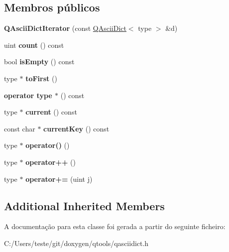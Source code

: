 \subsection*{Membros públicos}
\begin{DoxyCompactItemize}
\item 
\hypertarget{class_q_ascii_dict_iterator_abe4c7e3f541c4d934d003ac9fa6db236}{{\bfseries Q\-Ascii\-Dict\-Iterator} (const \hyperlink{class_q_ascii_dict}{Q\-Ascii\-Dict}$<$ type $>$ \&d)}\label{class_q_ascii_dict_iterator_abe4c7e3f541c4d934d003ac9fa6db236}

\item 
\hypertarget{class_q_ascii_dict_iterator_a774149fc271ebaba2aabcd183a836e8f}{uint {\bfseries count} () const }\label{class_q_ascii_dict_iterator_a774149fc271ebaba2aabcd183a836e8f}

\item 
\hypertarget{class_q_ascii_dict_iterator_a479432127ee77145cc19d6a2d1590821}{bool {\bfseries is\-Empty} () const }\label{class_q_ascii_dict_iterator_a479432127ee77145cc19d6a2d1590821}

\item 
\hypertarget{class_q_ascii_dict_iterator_a7e3cadfe5d178fc4db2e97112af20024}{type $\ast$ {\bfseries to\-First} ()}\label{class_q_ascii_dict_iterator_a7e3cadfe5d178fc4db2e97112af20024}

\item 
\hypertarget{class_q_ascii_dict_iterator_a2e144510e7eb044f9d96660f6590a589}{{\bfseries operator type $\ast$} () const }\label{class_q_ascii_dict_iterator_a2e144510e7eb044f9d96660f6590a589}

\item 
\hypertarget{class_q_ascii_dict_iterator_ac22b90cda8a81fe45ae121578fcf9726}{type $\ast$ {\bfseries current} () const }\label{class_q_ascii_dict_iterator_ac22b90cda8a81fe45ae121578fcf9726}

\item 
\hypertarget{class_q_ascii_dict_iterator_a61c51c740822498cafca355946ba7cbb}{const char $\ast$ {\bfseries current\-Key} () const }\label{class_q_ascii_dict_iterator_a61c51c740822498cafca355946ba7cbb}

\item 
\hypertarget{class_q_ascii_dict_iterator_a53bb20f7dd4f90cc047f999b7dec5fe0}{type $\ast$ {\bfseries operator()} ()}\label{class_q_ascii_dict_iterator_a53bb20f7dd4f90cc047f999b7dec5fe0}

\item 
\hypertarget{class_q_ascii_dict_iterator_a60e0a5b2a616525ebaec6c235b066c3e}{type $\ast$ {\bfseries operator++} ()}\label{class_q_ascii_dict_iterator_a60e0a5b2a616525ebaec6c235b066c3e}

\item 
\hypertarget{class_q_ascii_dict_iterator_a689beef631dff5b294c16f1246e6c230}{type $\ast$ {\bfseries operator+=} (uint j)}\label{class_q_ascii_dict_iterator_a689beef631dff5b294c16f1246e6c230}

\end{DoxyCompactItemize}
\subsection*{Additional Inherited Members}


A documentação para esta classe foi gerada a partir do seguinte ficheiro\-:\begin{DoxyCompactItemize}
\item 
C\-:/\-Users/teste/git/doxygen/qtools/qasciidict.\-h\end{DoxyCompactItemize}
